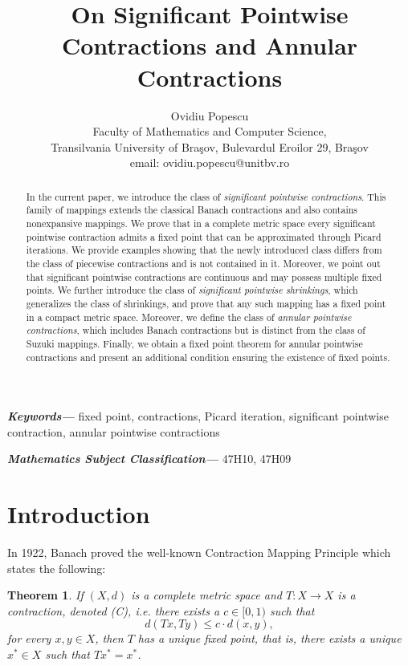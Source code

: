 \documentclass[12 pt]{article}
\title{On Significant Pointwise Contractions and Annular Contractions}
\author{Ovidiu Popescu 
	\\ \small{Faculty of Mathematics and Computer Science,}\\ \small{Transilvania University of Bra\c sov, Bulevardul Eroilor 29, Bra\c sov}\\
	\small{email: {ovidiu.popescu@unitbv.ro}}}
\date{}
\theoremstyle{lema}
\theoremstyle{proposition}
\theoremstyle{theorem}
\newtheorem{theorem}{Theorem}[section]
\theoremstyle{theorem}
\theoremstyle{corollary}
\theoremstyle{definition}
\theoremstyle{example}
\providecommand{\keywords}[1]
{
	\small	
	\textbf{\textit{Keywords---}} #1
}
\providecommand{\msc}[1]
{
	\small	
	\textbf{\textit{Mathematics Subject Classification---}} #1
}
\begin{document}
	
	\maketitle
	
	
	\begin{abstract}
		In the current paper, we introduce the class of \textit{significant pointwise contractions}. This family of mappings extends the classical Banach contractions and also contains nonexpansive mappings. We prove that in a complete metric space every significant pointwise contraction admits a fixed point that can be approximated through Picard iterations. We provide examples showing that the newly introduced class differs from the class of piecewise contractions and is not contained in it. Moreover, we point out that significant pointwise contractions are continuous and may possess multiple fixed points. We further introduce the class of \textit{significant pointwise shrinkings}, which generalizes the class of shrinkings, and prove that any such mapping has a fixed point in a compact metric space. Moreover, we define the class of \textit{annular pointwise contractions}, which includes Banach contractions but is distinct from the class of Suzuki mappings. Finally, we obtain a fixed point theorem for annular pointwise contractions and present an additional condition ensuring the existence of fixed points.
	\end{abstract}
	
	\keywords{fixed point, contractions, Picard iteration, significant pointwise contraction, annular pointwise contractions}
	
	\msc{47H10, 47H09}
	
	
	\section{Introduction}
	
	\noindent 
	
	In 1922, Banach \cite{Banach} proved the well-known Contraction Mapping Principle which states the following:
	
	\begin{theorem}
		If $(X,d)$ is a complete metric space and $T:X\to X$ is a contraction, denoted (C), i.e. there exists a $c\in [0,1)$ such that 
		\[ d(Tx,Ty) \leq c\cdot d(x,y),\]
		for every $x,y \in X$, then $T$ has a unique fixed point, that is, there exists a unique \(x^* \in X\) such that $Tx^*=x^*$.
	\end{theorem} 
\end{document}
